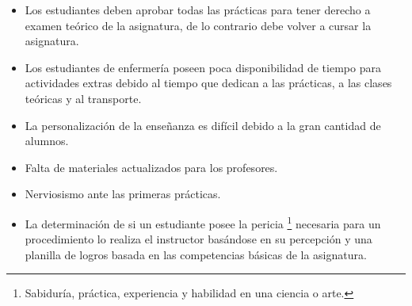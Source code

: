 \begin{itemize}
\item Los estudiantes deben aprobar todas las prácticas para tener derecho a 
examen teórico de la asignatura, de lo contrario debe volver a cursar la 
asignatura.
\item Los estudiantes de enfermería poseen poca disponibilidad de tiempo para
actividades extras debido al tiempo que dedican a las prácticas, a las clases teóricas y al transporte\cite{iab:tesis_alumnos}.
\item La personalización de la enseñanza es difícil debido a la gran cantidad de alumnos\cite{iab:tesis_alumnos}.
\item Falta de materiales actualizados para los profesores\cite{iab:tesis_alumnos}.
\item Nerviosismo ante las primeras prácticas.
\item La determinación de si un estudiante posee la pericia \footnote{Sabiduría, práctica, experiencia y habilidad en una ciencia o arte.} necesaria para 
un procedimiento lo realiza el instructor basándose en su percepción y una planilla de logros basada en las competencias básicas de la asignatura.
\end{itemize}





